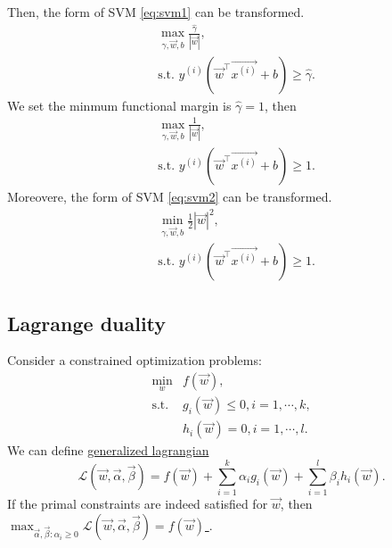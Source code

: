 \documentclass[10pt,onecolumn]{book}
\begin{document}
Then, the form of SVM \ref{eq:svm1} can be transformed.
\begin{equation}
\begin{split}
& \max_{\gamma, \vec{w}, b} \frac{\hat{\gamma}}{|\vec{w}|}, \\
& \text{s.t. } y^{(i)}(\vec{w}^\top \overrightarrow{x^{(i)}} + b) \geq \hat{\gamma}.
\end{split}
\end{equation}
We set the minmum functional margin is $\hat{\gamma} = 1$, then 
\begin{equation}\label{eq:svm2}
\begin{split}
& \max_{\gamma, \vec{w}, b} \frac{1}{|\vec{w}|}, \\
& \text{s.t. } y^{(i)}(\vec{w}^\top \overrightarrow{x^{(i)}} + b) \geq 1.
\end{split}
\end{equation}
Moreovere, the form of SVM \ref{eq:svm2} can be transformed.
\begin{equation}\label{eq:svm3}
\begin{split}
& \min_{\gamma, \vec{w}, b} \frac{1}{2}|\vec{w}|^2, \\
& \text{s.t. } y^{(i)}(\vec{w}^\top \overrightarrow{x^{(i)}} + b) \geq 1.
\end{split}
\end{equation}

\subsection{Lagrange duality}
Consider a constrained optimization problems:
\begin{equation}
\begin{split}
\min_w & f(\vec{w}), \\
\text{s.t. } & g_i(\vec{w}) \leq 0, i =1,\cdots, k, \\
			 & h_i(\vec{w}) = 0, i =1, \cdots, l.
\end{split}
\end{equation}
We can define \uline{generalized lagrangian}
\begin{equation}
\mathcal{L}(\vec{w}, \vec{\alpha}, \vec{\beta}) = f(\vec{w}) + \sum_{i = 1}^k \alpha_i g_i(\vec{w}) + \sum_{i = 1}^l \beta_i h_i(\vec{w}).
\end{equation}
If the primal constraints are indeed satisfied for $\vec{w}$, then \uline{$\max_{\vec{\alpha}, \vec{\beta}: \alpha_i \geq 0} \mathcal{L}(\vec{w}, \vec{\alpha}, \vec{\beta}) = f(\vec{w})$ }.
\end{document}
